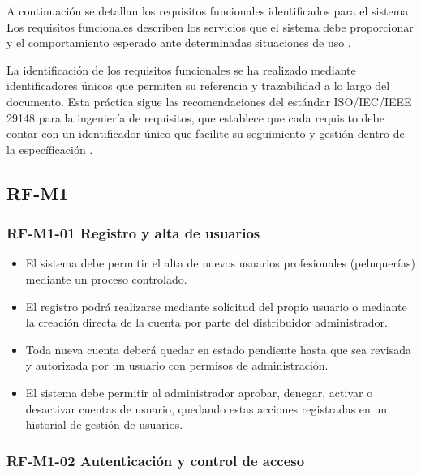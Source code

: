 A continuación se detallan los requisitos funcionales identificados para el sistema.  Los requisitos funcionales describen los servicios que el sistema debe proporcionar  y el comportamiento esperado ante determinadas situaciones de uso  \cite[Chap.~4.1.1, pp.~85--87]{sommerville}.

La identificación de los requisitos funcionales se ha realizado mediante identificadores únicos que permiten su referencia y trazabilidad a lo largo del documento. Esta práctica sigue las recomendaciones del estándar ISO/IEC/IEEE 29148 para la ingeniería de requisitos, que establece que cada requisito debe contar con un identificador único que facilite su seguimiento y gestión dentro de la específicación \cite{ieee29148}.


\subsection{RF-M1}

\vspace{-0.75em}
\subsubsection{RF-M1-01 Registro y alta de usuarios}
\vspace{-1em}

\begin{itemize}
    \item El sistema debe permitir el alta de nuevos usuarios profesionales (peluquerías) mediante un proceso controlado.
    \item El registro podrá realizarse mediante solicitud del propio usuario o mediante la creación directa de la cuenta por parte del distribuidor administrador.
    \item Toda nueva cuenta deberá quedar en estado pendiente hasta que sea revisada y autorizada por un usuario con permisos de administración.
    \item El sistema debe permitir al administrador aprobar, denegar, activar o desactivar cuentas de usuario, quedando estas acciones registradas en un historial de gestión de usuarios.
\end{itemize}

\vspace{-0.75em}
\subsubsection{RF-M1-02 Autenticación y control de acceso}
\vspace{-1em}


